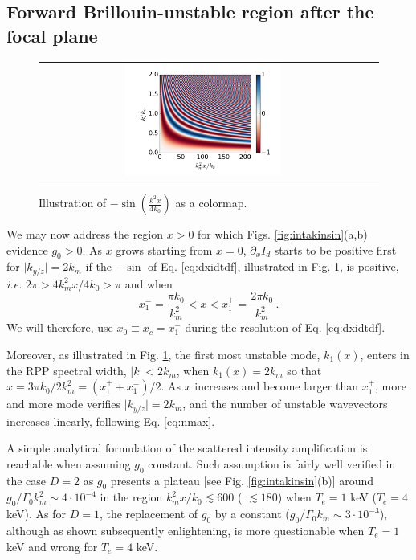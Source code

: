 \documentclass[
 reprint,
 amsmath,amssymb,
 aps,
]{revtex4-1}
\begin{document}
\subsection{Forward Brillouin-unstable region after the focal plane}
\begin{figure}[!]
\begin{tabular}{cc}
\includegraphics[width=0.49\textwidth]{sin2.png}\\
\end{tabular}
\caption{ \label{fig:sin2} Illustration of $-\sin\left({\frac{ k^2x}{4k_0}}  \right)$ as a colormap.}
\end{figure}
We may now address the region $x>0$ for which Figs. \ref{fig:intakinsin}(a,b) evidence $g_0>0$.
As $x$ grows starting from  $x=0$,  $\partial_x I_d$ starts to be positive  first for  $\vert k_{y/z} \vert= 2k_m$  if the $-\sin$ of Eq. \eqref{eq:dxidtdf}, illustrated in Fig. \ref{fig:sin2}, is positive, \emph{i.e.} $2\pi>4k_m^2x/4k_0>\pi$ and  when 
\begin{equation}\label{eq:xc}
x_1^- = \frac{\pi k_0 }{k_m^2}  <x < x_1^+ = \frac{2\pi k_0 }{k_m^2} \, .
\end{equation}
We will therefore,  use $x_0\equiv x_c=x_1^-$ during the resolution of Eq. \eqref{eq:dxidtdf}. 

Moreover, as illustrated in Fig. \ref{fig:sin2}, the first most unstable mode, $k_1(x)$, enters in the  RPP spectral width, $\vert k \vert< 2k_m$, when $k_1(x)=2k_m$ so that 
$x=3\pi k_0 /2k_m^2=(x_1^++x_1^-)/2$. As $x$ increases and become larger than $x_1^+$, more and more mode verifies $\vert k_{y/z} \vert= 2k_m$, and the number of unstable wavevectors increases linearly, following Eq. \eqref{eq:nmax}.

A simple analytical formulation of the scattered  intensity amplification is reachable  when assuming $g_0$ constant. Such assumption is fairly well verified in the case $D=2$ as $g_0$ presents a plateau [see Fig. \ref{fig:intakinsin}(b)]  around $g_0/\Gamma_0k_m^2 \sim 4\cdot 10^{-4}$  in the region $k_m^2x/k_0  \lesssim  600 $ ( $  \lesssim  180 $) when $T_e=1$ keV ($T_e=4$ keV). 
As for $D=1$, the replacement of  $g_0$ by a constant ($g_0/\Gamma_0k_m\sim 3\cdot 10^{-3}$), although as shown subsequently enlightening, is more questionable when  $T_e=1$ keV and wrong for $T_e=4$ keV.
\end{document}
